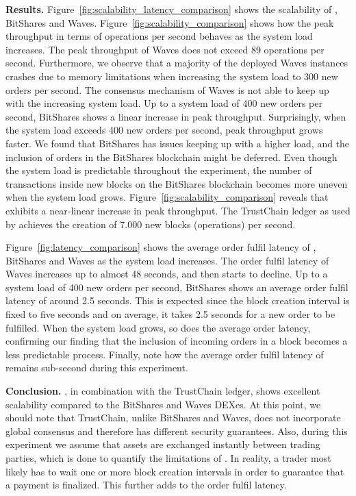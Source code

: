 \textbf{Results.}
Figure~\ref{fig:scalability_latency_comparison} shows the scalability of \ModelName{}, BitShares and Waves.
Figure~\ref{fig:scalability_comparison} shows how the peak throughput in terms of operations per second behaves as the system load increases.
The peak throughput of Waves does not exceed 89 operations per second.
Furthermore, we observe that a majority of the deployed Waves instances crashes due to memory limitations when increasing the system load to 300 new orders per second.
The consensus mechanism of Waves is not able to keep up with the increasing system load.
Up to a system load of 400 new orders per second, BitShares shows a linear increase in peak throughput.
Surprisingly, when the system load exceeds 400 new orders per second, peak throughput grows faster.
We found that BitShares has issues keeping up with a higher load, and the inclusion of orders in the BitShares blockchain might be deferred.
Even though the system load is predictable throughout the experiment, the number of transactions inside new blocks on the BitShares blockchain becomes more uneven when the system load grows.
Figure~\ref{fig:scalability_comparison} reveals that \ModelName{} exhibits a near-linear increase in peak throughput.
The TrustChain ledger as used by \ModelName{} achieves the creation of 7.000 new blocks (operations) per second.

Figure~\ref{fig:latency_comparison} shows the average order fulfil latency of \ModelName{}, BitShares and Waves as the system load increases.
The order fulfil latency of Waves increases up to almost 48 seconds, and then starts to decline.
Up to a system load of 400 new orders per second, BitShares shows an average order fulfil latency of around 2.5 seconds.
This is expected since the block creation interval is fixed to five seconds and on average, it takes 2.5 seconds for a new order to be fulfilled.
When the system load grows, so does the average order latency, confirming our finding that the inclusion of incoming orders in a block becomes a less predictable process.
Finally, note how the average order fulfil latency of \ModelName{} remains sub-second during this experiment.

\textbf{Conclusion.}
\ModelName{}, in combination with the TrustChain ledger, shows excellent scalability compared to the BitShares and Waves DEXes.
At this point, we should note that TrustChain, unlike BitShares and Waves, does not incorporate global consensus and therefore has different security guarantees.
Also, during this experiment we assume that \ModelName{} assets are exchanged instantly between trading parties, which is done to quantify the limitations of \ModelName{}.
In reality, a trader most likely has to wait one or more block creation intervals in order to guarantee that a payment is finalized.
This further adds to the order fulfil latency.

